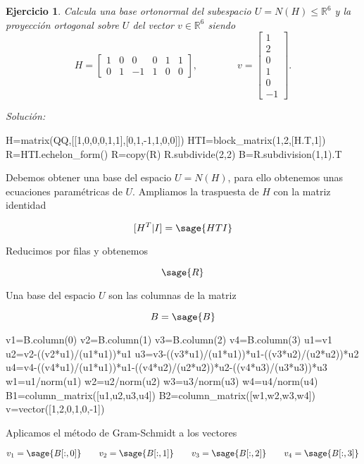 \documentclass{amsart}
\newtheorem{ejer}{Ejercicio}
\begin{document}
\vspace{0.5cm}
\begin{ejer}
Calcula una base ortonormal del subespacio $U=N(H) \leq \mathbb{R}^6$ y la proyección ortogonal sobre $U$ del vector $v\in \mathbb{R}^6$ siendo
$$
    H=
    \left[
    \begin{array}{rrrrrr}
    1 & 0 & 0 & 0 & 1 & 1 \\
    0 & 1 & -1 & 1 & 0 & 0
    \end{array}
    \right],
    \qquad\qquad
    v=
    \left[
    \begin{array}{r}
    1 \\
    2 \\
    0 \\
    1 \\
    0 \\
    -1 
    \end{array}
    \right].
$$
\end{ejer}

{\it Solución:}


\begin{sageblock}
H=matrix(QQ,[[1,0,0,0,1,1],[0,1,-1,1,0,0]])
HTI=block_matrix(1,2,[H.T,1])
R=HTI.echelon_form()
R=copy(R)
R.subdivide(2,2)
B=R.subdivision(1,1).T
\end{sageblock}

Debemos obtener una base del espacio $U = N(H)$, para ello obtenemos unas ecuaciones paramétricas de $U$. Ampliamos la traspuesta de $H$ con la matriz identidad

$$ [H^T | I] = \sage{HTI} $$

Reducimos por filas y obtenemos

$$ \sage{R} $$

Una base del espacio $U$ son las columnas de la matriz

$$ B = \sage{B} $$

\begin{sageblock}
v1=B.column(0)
v2=B.column(1)
v3=B.column(2)
v4=B.column(3)
u1=v1
u2=v2-((v2*u1)/(u1*u1))*u1
u3=v3-((v3*u1)/(u1*u1))*u1-((v3*u2)/(u2*u2))*u2
u4=v4-((v4*u1)/(u1*u1))*u1-((v4*u2)/(u2*u2))*u2-((v4*u3)/(u3*u3))*u3
w1=u1/norm(u1)
w2=u2/norm(u2)
w3=u3/norm(u3)
w4=u4/norm(u4)
B1=column_matrix([u1,u2,u3,u4])
B2=column_matrix([w1,w2,w3,w4])
v=vector([1,2,0,1,0,-1])
\end{sageblock}

Aplicamos el método de Gram-Schmidt a los vectores

$$ v_1=\sage{B[:,0]} \qquad v_2=\sage{B[:,1]} \qquad v_3=\sage{B[:,2]} \qquad v_4=\sage{B[:,3]} $$
\end{document}
